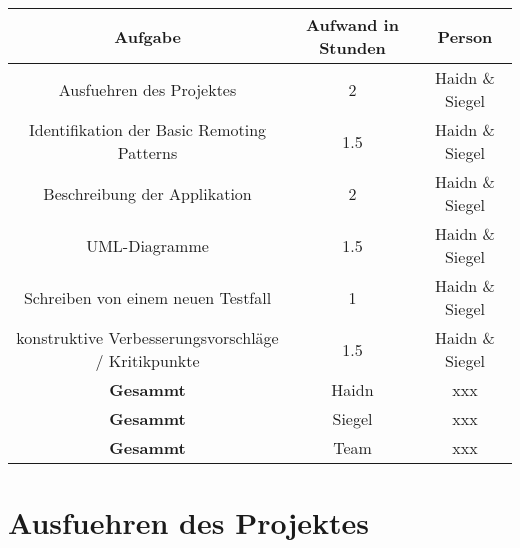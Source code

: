 \documentclass[a4paper]{article}
\begin{document}
\begin{center}
  \begin{tabular}{ | c | c | c | }
    \hline
\textbf{Aufgabe} & \textbf{Aufwand in Stunden} & \textbf{Person} \\ 
    \hline 
    \hline
	Ausfuehren des Projektes & 2 & Haidn \& Siegel \\ 
    \hline
	Identifikation der Basic Remoting Patterns & 1.5 & Haidn \& Siegel \\ 
    \hline
	Beschreibung der Applikation & 2 & Haidn \& Siegel \\ 
    \hline
	UML-Diagramme & 1.5 & Haidn \& Siegel \\ 
    \hline
	Schreiben von einem neuen Testfall & 1 & Haidn \& Siegel \\ 
    \hline
	konstruktive Verbesserungsvorschläge / Kritikpunkte & 1.5 & Haidn \& Siegel \\ 
    \hline
	 \hline
	 \textbf{Gesammt} & Haidn & xxx \\ 
	 \hline
	 \textbf{Gesammt} & Siegel & xxx\\ 
	 \hline
	 \textbf{Gesammt} & Team & xxx \\ 
  \end{tabular}
\end{center}
\newpage
\section{Ausfuehren des Projektes}	
	
\end{document}
